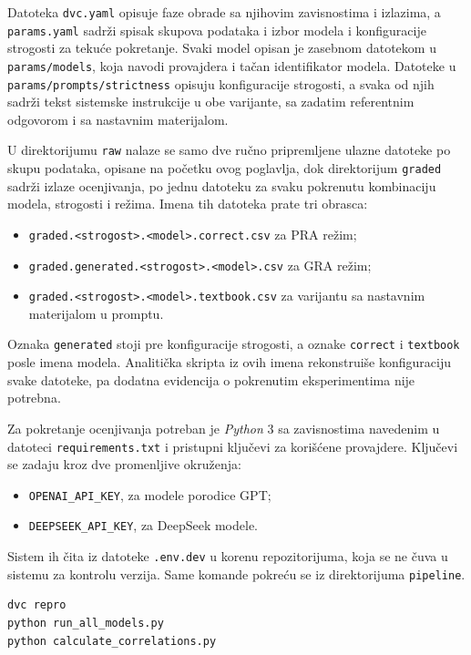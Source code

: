 Datoteka \texttt{dvc.yaml} opisuje faze obrade sa njihovim zavisnostima i izlazima,
a \texttt{params.yaml} sadrži spisak skupova podataka
i izbor modela i konfiguracije strogosti za tekuće pokretanje.
Svaki model opisan je zasebnom datotekom u \texttt{params/models},
koja navodi provajdera i tačan identifikator modela.
Datoteke u \texttt{params/prompts/strictness} opisuju konfiguracije strogosti,
a svaka od njih sadrži tekst sistemske instrukcije u obe varijante,
sa zadatim referentnim odgovorom i sa nastavnim materijalom.

U direktorijumu \texttt{raw} nalaze se samo dve ručno pripremljene ulazne datoteke po skupu podataka,
opisane na početku ovog poglavlja,
dok direktorijum \texttt{graded} sadrži izlaze ocenjivanja,
po jednu datoteku za svaku pokrenutu kombinaciju modela, strogosti i režima.
Imena tih datoteka prate tri obrasca:

\begin{itemize}
    \item \texttt{graded.<strogost>.<model>.correct.csv} za PRA režim;
    \item \texttt{graded.generated.<strogost>.<model>.csv} za GRA režim;
    \item \texttt{graded.<strogost>.<model>.textbook.csv} za varijantu sa nastavnim materijalom u promptu.
\end{itemize}

Oznaka \texttt{generated} stoji pre konfiguracije strogosti,
a oznake \texttt{correct} i \texttt{textbook} posle imena modela.
Analitička skripta iz ovih imena rekonstruiše konfiguraciju svake datoteke,
pa dodatna evidencija o pokrenutim eksperimentima nije potrebna.

Za pokretanje ocenjivanja potreban je \emph{Python} 3 sa zavisnostima navedenim
u datoteci \texttt{requirements.txt} i pristupni ključevi za korišćene provajdere.
Ključevi se zadaju kroz dve promenljive okruženja:

\begin{itemize}
    \item \texttt{OPENAI\_API\_KEY}, za modele porodice GPT;
    \item \texttt{DEEPSEEK\_API\_KEY}, za DeepSeek modele.
\end{itemize}

Sistem ih čita iz datoteke \texttt{.env.dev} u korenu repozitorijuma,
koja se ne čuva u sistemu za kontrolu verzija.
Same komande pokreću se iz direktorijuma \texttt{pipeline}.

\begin{tcolorbox}[promptbox, title={Pokretanje}]
\begin{verbatim}
dvc repro
python run_all_models.py
python calculate_correlations.py
\end{verbatim}
\end{tcolorbox}


